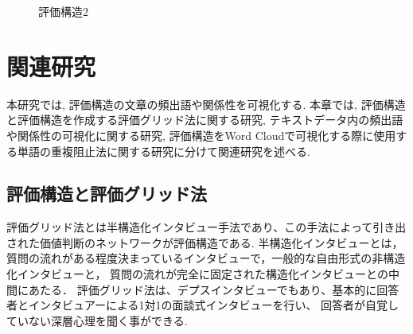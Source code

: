 \documentclass[syuuron]{kuee}
\begin{document}
		\begin{figure}
			\begin{center}
			\end{center}
			\caption{評価構造2}
	  		\label{fig:es3}
		\end{figure}

\chapter{関連研究}%
	本研究では, 評価構造の文章の頻出語や関係性を可視化する. 本章では, 評価構造と評価構造を作成する評価グリッド法に関する研究, 
	テキストデータ内の頻出語や関係性の可視化に関する研究, 評価構造をWord Cloudで可視化する際に使用する単語の重複阻止法に関する研究に分けて関連研究を述べる. 
	\section{評価構造と評価グリッド法}
		評価グリッド法とは半構造化インタビュー手法であり、この手法によって引き出された価値判断のネットワークが評価構造である\cite{egm6, egm7}. 
		半構造化インタビューとは，質問の流れがある程度決まっているインタビューで，一般的な自由形式の非構造化インタビューと，
		質問の流れが完全に固定された構造化インタビューとの中間にあたる．
		評価グリッド法は、デプスインタビューでもあり、基本的に回答者とインタビュアーによる1対1の面談式インタビューを行い、
		回答者が自覚していない深層心理を聞く事ができる. 
		
\end{document}
